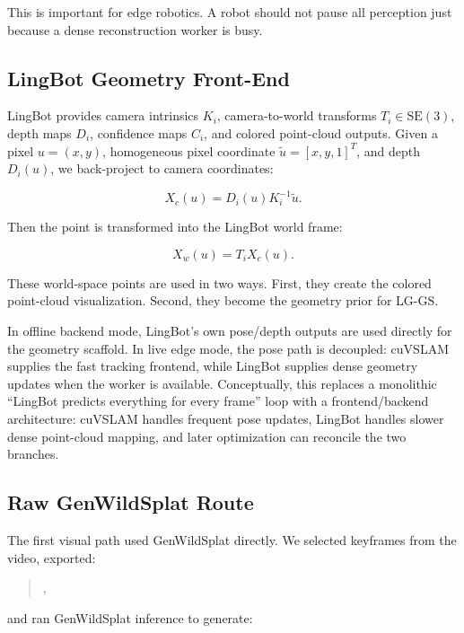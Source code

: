 \documentclass[11pt]{article}
\newcommand{\methodabbr}{LG-GS}
\newcommand{\RouteB}{\methodabbr\xspace}
\newcommand{\SE}{\mathrm{SE}(3)}
\begin{document}
This is important for edge robotics. A robot should not pause all perception just because a dense reconstruction worker is busy.

\subsection{LingBot Geometry Front-End}

LingBot provides camera intrinsics \(K_i\), camera-to-world transforms \(T_i \in \SE\), depth maps \(D_i\), confidence maps \(C_i\), and colored point-cloud outputs. Given a pixel \(u=(x,y)\), homogeneous pixel coordinate \(\tilde{u}=[x,y,1]^T\), and depth \(D_i(u)\), we back-project to camera coordinates:

\begin{equation}
X_c(u) = D_i(u)K_i^{-1}\tilde{u}.
\end{equation}

Then the point is transformed into the LingBot world frame:

\begin{equation}
X_w(u) = T_i X_c(u).
\end{equation}

These world-space points are used in two ways. First, they create the colored point-cloud visualization. Second, they become the geometry prior for \RouteB.

In offline backend mode, LingBot's own pose/depth outputs are used directly for the geometry scaffold. In live edge mode, the pose path is decoupled: cuVSLAM supplies the fast tracking frontend, while LingBot supplies dense geometry updates when the worker is available. Conceptually, this replaces a monolithic ``LingBot predicts everything for every frame'' loop with a frontend/backend architecture: cuVSLAM handles frequent pose updates, LingBot handles slower dense point-cloud mapping, and later optimization can reconcile the two branches.

\subsection{Raw GenWildSplat Route}

The first visual path used GenWildSplat directly. We selected keyframes from the video, exported:

\begin{quote}
, 
\end{quote}

and ran GenWildSplat inference to generate:
\end{document}
